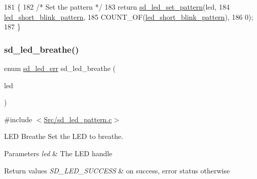 \begin{DoxyCode}
181 \{
182     \textcolor{comment}{/* Set the pattern */}
183     \textcolor{keywordflow}{return} \mbox{\hyperlink{group___s_d___l_e_d___functions_ga5641c6ed41cf81ecbd2d61731a412667}{sd\_led\_set\_pattern}}(led, 
184                 \mbox{\hyperlink{group___s_d___l_e_d___pattern___definitions_gab00146182d393d8d60879aa35205ffe2}{led\_short\_blink\_pattern}},
185                 COUNT\_OF(\mbox{\hyperlink{group___s_d___l_e_d___pattern___definitions_gab00146182d393d8d60879aa35205ffe2}{led\_short\_blink\_pattern}}),
186                 0);
187 \}
\end{DoxyCode}
\mbox{\label{group___s_d___l_e_d___pattern___functions_ga743f3686e524d035a3ed677d4de93869}} 
\subsubsection{\texorpdfstring{sd\+\_\+led\+\_\+breathe()}{sd\_led\_breathe()}}
{\footnotesize\ttfamily enum \mbox{\hyperlink{group___s_d___l_e_d___types_ga4f347a1003b4089de88a7f0fc62c1071}{sd\+\_\+led\+\_\+err}} sd\+\_\+led\+\_\+breathe (\begin{DoxyParamCaption}\item[{struct \mbox{\hyperlink{structsd__led}{sd\+\_\+led}} $\ast$}]{led }\end{DoxyParamCaption})}



{\ttfamily \#include $<$\mbox{\hyperlink{sd__led__pattern_8c}{Src/sd\+\_\+led\+\_\+pattern.\+c}}$>$}



L\+ED Breathe Set the L\+ED to breathe. 


\begin{DoxyParams}{Parameters}
{\em led} & The L\+ED handle \\
\hline
\end{DoxyParams}

\begin{DoxyRetVals}{Return values}
{\em S\+D\+\_\+\+L\+E\+D\+\_\+\+S\+U\+C\+C\+E\+SS} & on success, error status otherwise \\
\hline
\end{DoxyRetVals}

